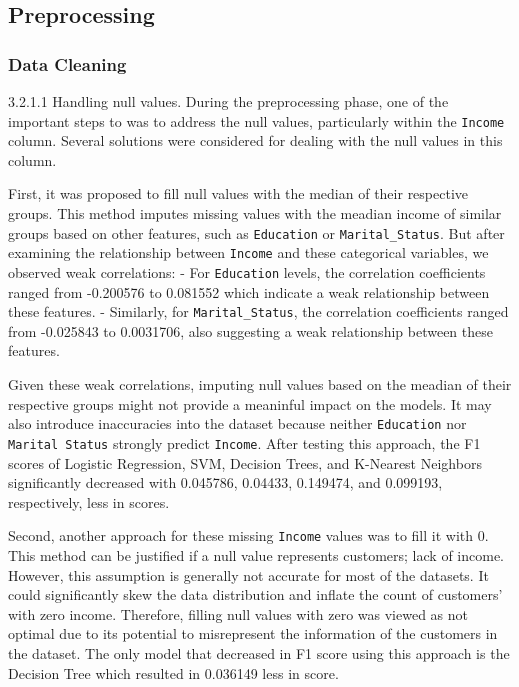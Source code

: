 \subsection{Preprocessing}

\subsubsection{Data Cleaning} 

    3.2.1.1 Handling null values. During the preprocessing phase, one of the important steps to was to address the null values, particularly within the \texttt{Income} column. Several solutions were considered for dealing with the null values in this column. 

    First, it was proposed to fill null values with the median of their respective groups. This method imputes missing values with the meadian income of similar groups based on other features, such as \texttt{Education} or \texttt{Marital\_Status}. But after examining the relationship between \texttt{Income} and these categorical variables, we observed weak correlations:
        - For \texttt{Education} levels, the correlation coefficients ranged from -0.200576 to 0.081552 which indicate a weak relationship between these features.
        - Similarly, for \texttt{Marital\_Status}, the correlation coefficients ranged from -0.025843 to 0.0031706, also suggesting a weak relationship between these features.

    Given these weak correlations, imputing null values based on the meadian of their respective groups might not provide a meaninful impact on the models. It may also introduce inaccuracies into the dataset because neither \texttt{Education} nor \texttt{Marital Status} strongly predict \texttt{Income}. After testing this approach, the F1 scores of Logistic Regression, SVM, Decision Trees, and K-Nearest Neighbors significantly decreased with 0.045786, 0.04433, 0.149474, and 0.099193, respectively, less in scores.

    Second, another approach for these missing \texttt{Income} values was to fill it with 0. This method can be justified if a null value represents customers; lack of income. However, this assumption is generally not accurate for most of the datasets. It could significantly skew the data distribution and inflate the count of customers' with zero income. Therefore, filling null values with zero was viewed as not optimal due to its potential to misrepresent the information of the customers in the dataset. The only model that decreased in F1 score using this approach is the Decision Tree which resulted in 0.036149 less in score.

